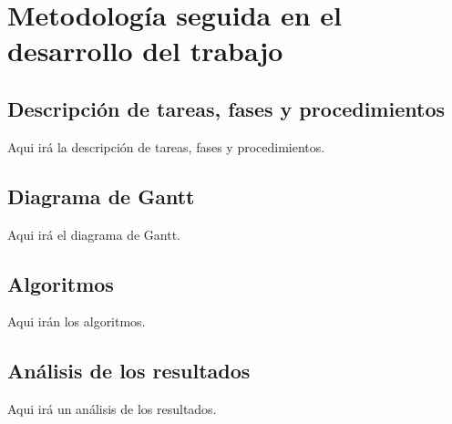 
\chapter{Metodología seguida en el desarrollo del trabajo} %

\label{Metodología} %

\section{Descripción de tareas, fases y procedimientos}

Aqui irá la descripción de tareas, fases y procedimientos.

\section{Diagrama de Gantt}

Aqui irá el diagrama de Gantt.

\section{Algoritmos}

Aqui irán los algoritmos.

\section{Análisis de los resultados}

Aqui irá un análisis de los resultados.


